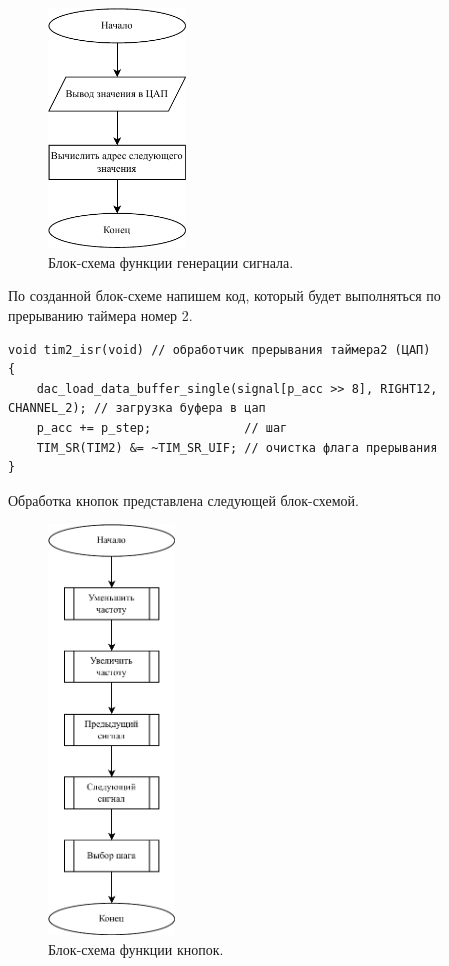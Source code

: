 	\begin{figure}[H]
    \centering
    \includegraphics[width=0.325\textwidth]{../image/dac.pdf}
    \caption{Блок-схема функции генерации сигнала.}
	\end{figure}
	
	По созданной блок-схеме напишем код, который будет выполняться по прерыванию таймера номер 2.
	
\begin{code}
\begin{verbatim}
void tim2_isr(void) // обработчик прерывания таймера2 (ЦАП)
{
    dac_load_data_buffer_single(signal[p_acc >> 8], RIGHT12, CHANNEL_2); // загрузка буфера в цап
    p_acc += p_step;             // шаг
    TIM_SR(TIM2) &= ~TIM_SR_UIF; // очистка флага прерывания
}
\end{verbatim}
\end{code}
	
	Обработка кнопок представлена следующей блок-схемой.	
	
	\begin{figure}[H]
    \centering
    \includegraphics[width=0.3\textwidth]{../image/buttons.pdf}
    \caption{Блок-схема функции кнопок.}
	\end{figure}
	

